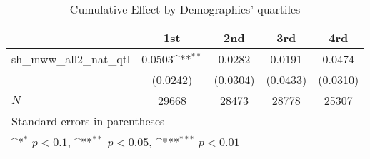 \begin{table}[htbp]\centering
\def\sym#1{\ifmmode^{#1}\else\(^{#1}\)\fi}
\caption{Cumulative Effect by Demographics' quartiles}
\begin{tabular}{l*{4}{c}}
\hline\hline
            &\multicolumn{1}{c}{1st}&\multicolumn{1}{c}{2nd}&\multicolumn{1}{c}{3rd}&\multicolumn{1}{c}{4rd}\\
\hline
sh\_mww\_all2\_nat\_qtl&      0.0503\sym{**} &      0.0282         &      0.0191         &      0.0474         \\
            &    (0.0242)         &    (0.0304)         &    (0.0433)         &    (0.0310)         \\
\hline
\(N\)       &       29668         &       28473         &       28778         &       25307         \\
\hline\hline
\multicolumn{5}{l}{\footnotesize Standard errors in parentheses}\\
\multicolumn{5}{l}{\footnotesize \sym{*} \(p<0.1\), \sym{**} \(p<0.05\), \sym{***} \(p<0.01\)}\\
\end{tabular}
\end{table}
